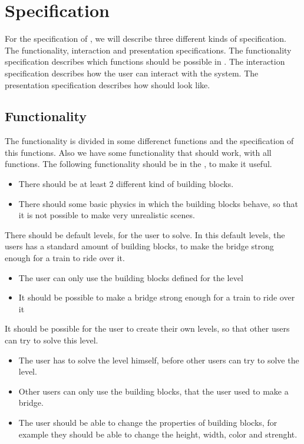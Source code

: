 \section{Specification}
For the specification of \name, we will describe three different kinds of specification. The functionality, interaction and presentation specifications. The functionality specification describes which functions should be possible in \name. The interaction specification describes how the user can interact with the system. The presentation specification describes how \name should look like. 
 \subsection{Functionality}
 The functionality is divided in some differenct functions and the specification of this functions. Also we have some functionality that should work, with all functions.
 The following functionality should be in the \name, to make it useful.
  \begin{itemize}
  \item There should be at least 2 different kind of building blocks. 
  \item There should some basic physics in which the building blocks behave, so that it is not possible to make very unrealistic scenes.
  \end{itemize}
  There should be default levels, for the user to solve. In this default levels, the users has a standard amount of building blocks, to make the bridge strong enough for a train to ride over it. 
 \begin{itemize}
 \item The user can only use the building blocks defined for the level
 \item It should be possible to make a bridge strong enough for a train to ride over it
 \end{itemize}
  It should be possible for the user to create their own levels, so that other users can try to solve this level. 
 \begin{itemize}
 \item The user has to solve the level himself, before other users can try to solve the level.
 \item Other users can only use the building blocks, that the user used to make a bridge.
 \item The user should be able to change the properties of building blocks, for example they should be able to change the height, width, color and strenght.
 \end{itemize}

